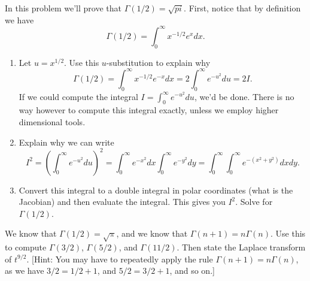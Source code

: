 \begin{problem}[$\Gamma(1/2)=\sqrt{\pi}$]
In this problem we'll prove that $\Gamma(1/2)=\sqrt{pi}$.  First, notice that by definition we have 
$$\Gamma(1/2) = \int_0^\infty x^{-1/2}e^{x}dx.$$
\begin{enumerate}
 \item Let $u=x^{1/2}$. Use this $u$-substitution to explain why 
$$
\Gamma(1/2)=\int_0^\infty x^{-1/2}e^{-x}dx = 
2\int_0^\infty e^{-u^2}du = 2I
.$$
 If we could compute the integral $I=\int_0^\infty e^{-u^2}du$, we'd be done. There is no way however to compute this integral exactly, unless we employ higher dimensional tools.
\item Explain why we can write
$$
I^2=\left(\int_0^\infty e^{-u^2}du\right)^2 
= \int_0^\infty e^{-x^2}dx\int_0^\infty e^{-y^2}dy 
= \int_0^\infty\int_0^\infty e^{-(x^2+y^2)}dxdy.
$$
  \item Convert this integral to a double integral in polar coordinates (what is the Jacobian) and then evaluate the integral. This gives you $I^2$. Solve for $\Gamma(1/2)$.  
\end{enumerate}

 
\end{problem}


\begin{problem}
 We know that $\Gamma(1/2) = \sqrt{\pi}$, and we know that $\Gamma(n+1)=n\Gamma(n)$.  Use this to compute $\Gamma(3/2)$, $\Gamma(5/2)$, and $\Gamma(11/2)$. Then state the Laplace transform of $t^{9/2}$.  [Hint: You may have to repeatedly apply the rule $\Gamma(n+1)=n\Gamma(n)$, as we have $3/2=1/2+1$, and $5/2=3/2+1$, and so on.]
\end{problem}









































